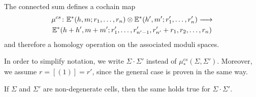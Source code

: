 \begin{prop}
    \label{homology_operations:parallel_multiplication:multiplication_is_a_cochainmap}
    The connected sum defines a cochain map
    \begin{multline*}
        \mu^{cs} \colon \E^\ast(h,m;r_1, \ldots, r_n) \otimes \E^\ast(h',m';r_1', \ldots, r_n') \to\\
        \E^\ast(h+h', m+m'; r_1', \ldots, r_{n'-1}', r_{n'}' + r_1, r_2, \ldots, r_n)
    \end{multline*}
    and therefore a homology operation on the associated moduli spaces.
\end{prop}

\begin{notation}
    In order to simplify notation, we write $\Sigma \cdot \Sigma'$ instead of $\mu^{cs}_\ast(\Sigma, \Sigma')$.
    Moreover, we assume $r = [(1)] = r'$, since the general case is proven in the same way.
\end{notation}

\begin{lem}
    \label{homology_operations:parallel_multiplication:multiplication_is_well_def}
    If $\Sigma$ and $\Sigma'$ are non-degenerate cells, then the same holds true for $\Sigma \cdot \Sigma'$.
\end{lem}


